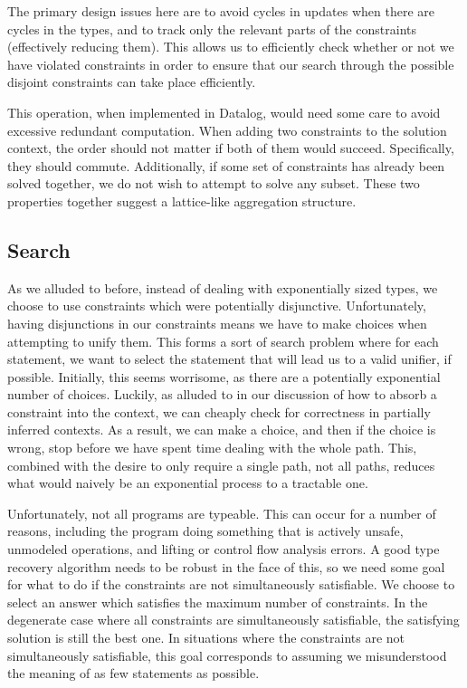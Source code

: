 The primary design issues here are to avoid cycles in updates when there are cycles in the types, and to track only the relevant parts of the constraints (effectively reducing them). This allows us to efficiently check whether or not we have violated constraints in order to ensure that our search through the possible disjoint constraints can take place efficiently.

This operation, when implemented in Datalog, would need some care to avoid excessive redundant computation.
When adding two constraints to the solution context, the order should not matter if both of them would succeed.
Specifically, they should commute.
Additionally, if some set of constraints has already been solved together, we do not wish to attempt to solve any subset.
These two properties together suggest a lattice-like aggregation structure.

\subsection{Search}
As we alluded to before, instead of dealing with exponentially sized types, we choose to use constraints which were potentially disjunctive. Unfortunately, having disjunctions in our constraints means we have to make choices when attempting to unify them. This forms a sort of search problem where for each statement, we want to select the statement that will lead us to a valid unifier, if possible. Initially, this seems worrisome, as there are a potentially exponential number of choices. Luckily, as alluded to in our discussion of how to absorb a constraint into the context, we can cheaply check for correctness in partially inferred contexts. As a result, we can make a choice, and then if the choice is wrong, stop before we have spent time dealing with the whole path. This, combined with the desire to only require a single path, not all paths, reduces what would naively be an exponential process to a tractable one.

Unfortunately, not all programs are typeable. This can occur for a number of reasons, including the program doing something that is actively unsafe, unmodeled operations, and lifting or control flow analysis errors. A good type recovery algorithm needs to be robust in the face of this, so we need some goal for what to do if the constraints are not simultaneously satisfiable. We choose to select an answer which satisfies the maximum number of constraints. In the degenerate case where all constraints are simultaneously satisfiable, the satisfying solution is still the best one.
In situations where the constraints are not simultaneously satisfiable, this goal corresponds to assuming we misunderstood the meaning of as few statements as possible.

